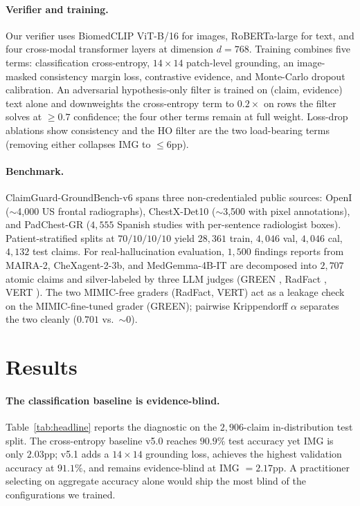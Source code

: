 \documentclass[10pt,twocolumn,letterpaper]{article}
\begin{document}
\paragraph{Verifier and training.} Our verifier uses BiomedCLIP ViT-B/16 \citep{zhang2023biomedclip} for images, RoBERTa-large \citep{liu2019roberta} for text, and four cross-modal transformer layers at dimension $d=768$. Training combines five terms: classification cross-entropy, $14\!\times\!14$ patch-level grounding, an image-masked consistency margin loss, contrastive evidence, and Monte-Carlo dropout calibration. An adversarial hypothesis-only filter is trained on (claim, evidence) text alone and downweights the cross-entropy term to $0.2\times$ on rows the filter solves at $\geq 0.7$ confidence; the four other terms remain at full weight. Loss-drop ablations show consistency and the HO filter are the two load-bearing terms (removing either collapses IMG to $\leq 6$pp).

\paragraph{Benchmark.} ClaimGuard-GroundBench-v6 spans three non-credentialed public sources: OpenI \citep{demner2016preparing} ($\sim$4,000 US frontal radiographs), ChestX-Det10 \citep{liu2020chestxdet10} ($\sim$3,500 with pixel annotations), and PadChest-GR \citep{feijoo2024padchestgr} ($4{,}555$ Spanish studies with per-sentence radiologist boxes). Patient-stratified splits at $70/10/10/10$ yield $28{,}361$ train, $4{,}046$ val, $4{,}046$ cal, $4{,}132$ test claims. For real-hallucination evaluation, $1{,}500$ findings reports from MAIRA-2, CheXagent-2-3b, and MedGemma-4B-IT are decomposed into $2{,}707$ atomic claims and silver-labeled by three LLM judges (GREEN \citep{ostmeier2024green}, RadFact \citep{bannur2024maira2}, VERT \citep{tang2026vert}). The two MIMIC-free graders (RadFact, VERT) act as a leakage check on the MIMIC-fine-tuned grader (GREEN); pairwise Krippendorff $\alpha$ separates the two cleanly ($0.701$ vs.\ $\sim 0$).

\section{Results}
\label{sec:results}

\paragraph{The classification baseline is evidence-blind.} Table~\ref{tab:headline} reports the diagnostic on the $2{,}906$-claim in-distribution test split. The cross-entropy baseline v5.0 reaches $90.9\%$ test accuracy yet IMG is only $2.03$pp; v5.1 adds a $14\!\times\!14$ grounding loss, achieves the highest validation accuracy at $91.1\%$, and remains evidence-blind at IMG $=2.17$pp. A practitioner selecting on aggregate accuracy alone would ship the most blind of the configurations we trained.
\end{document}
